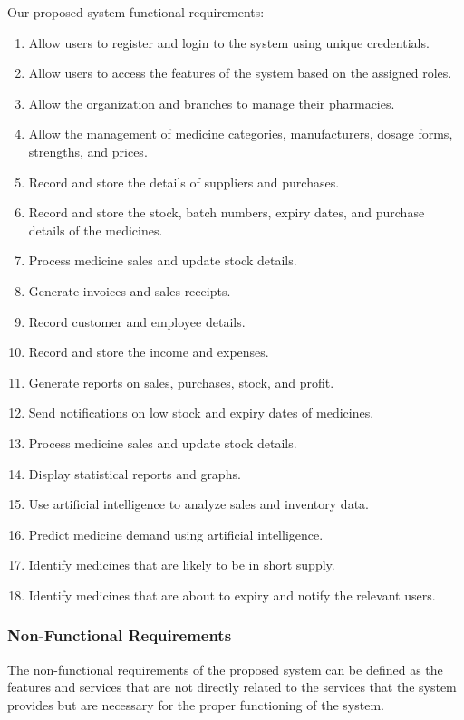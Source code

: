 \noindent Our proposed system functional requirements:
\begin{enumerate} 
    \setlength{\itemsep}{0pt}
    \setlength{\parsep}{0pt}
    \setlength{\topsep}{0pt}
    \item Allow users to register and login to the system using unique credentials.
    \item Allow users to access the features of the system based on the assigned roles.
    \item Allow the organization and branches to manage their pharmacies.
    \item Allow the management of medicine categories, manufacturers, dosage forms, strengths, and prices.
    \item Record and store the details of suppliers and purchases.
    \item Record and store the stock, batch numbers, expiry dates, and purchase details of the medicines.
    \item Process medicine sales and update stock details.
    \item Generate invoices and sales receipts.
    \item Record customer and employee details.
    \item Record and store the income and expenses.
    \item Generate reports on sales, purchases, stock, and profit.
    \item Send notifications on low stock and expiry dates of medicines.
    \item Process medicine sales and update stock details.
    \item Display statistical reports and graphs.
    \item Use artificial intelligence to analyze sales and inventory data.
    \item Predict medicine demand using artificial intelligence.
    \item Identify medicines that are likely to be in short supply.
    \item Identify medicines that are about to expiry and notify the relevant users.
\end{enumerate}

\subsubsection{Non-Functional Requirements}
The non-functional requirements of the proposed system can be defined as the features and services that are not directly related to the services that the system provides but are necessary for the proper functioning of the system.\\

